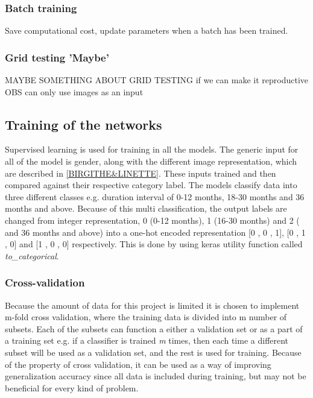\subsubsection{Batch training}
Save computational cost, update parameters when a batch has been trained. 
 
\subsubsection{Grid testing 'Maybe'}
MAYBE SOMETHING ABOUT GRID TESTING if we can make it reproductive
OBS can only use images as an input

 
 
\subsection{Training of the networks}
Supervised learning is used for training in all the models. The generic input for all of the model is gender, along with the different image representation, which are described in \autoref{BIRGITHE&LINETTE}. These inputs trained and then compared against their respective category label.   
The models classify data into three different classes e.g. duration interval of 0-12 months, 18-30 months and 36 months and above. Because of this multi classification, the output labels are changed from integer representation, 0 (0-12 months), 1 (16-30 months) and 2 ( and 36 months and above) into a one-hot encoded representation [0 , 0 , 1], [0 , 1 , 0] and [1 , 0 , 0] respectively. This is done by using keras utility function called \textit{to_categorical}. 



\subsubsection{Cross-validation}
Because the amount of data for this project is limited it is chosen to implement m-fold cross validation, where the training data is divided into m number of subsets. Each of the subsets can function a either a validation set or as a part of a training set e.g. if a classifier is trained \textit{m} times, then each time a different subset will be used as a validation set, and the rest is used for training. \citep{Duda2000}
Because of the property of cross validation, it can be used as a way of improving generalization accuracy since all data is included during training, but may not be beneficial for every kind of problem. \citep{Duda2000}

